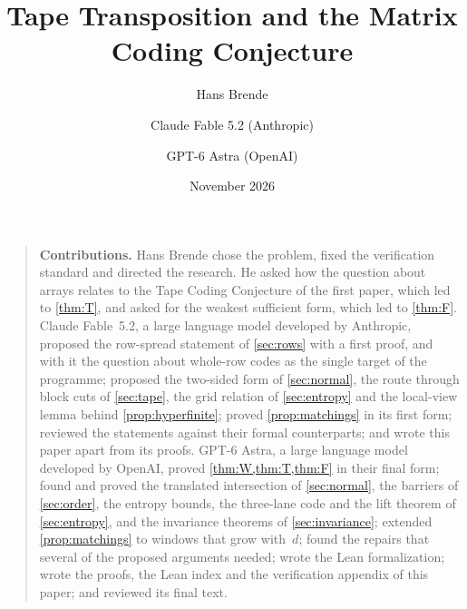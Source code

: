 \documentclass[11pt]{article}
\title{Tape Transposition and the Matrix Coding Conjecture}
\author{Hans Brende \and Claude Fable 5.2 (Anthropic) \and GPT-6 Astra (OpenAI)}
\date{November 2026}
\begin{document}
\maketitle

\begin{abstract}

\end{abstract}

\clearpage

\begin{quote}\small
\textbf{Contributions.} Hans Brende chose the problem, fixed the verification standard and directed the research. He
asked how the question about arrays relates to the Tape Coding Conjecture of the first paper, which led to
\cref{thm:T}, and asked for the weakest sufficient form, which led to \cref{thm:F}. Claude Fable~5.2, a large language
model developed by Anthropic, proposed the row-spread statement of \cref{sec:rows} with a first proof, and with it the
question about whole-row codes as the single target of the programme; proposed the two-sided form of
\cref{sec:normal}, the route through block cuts of \cref{sec:tape}, the grid relation of \cref{sec:entropy} and the
local-view lemma behind \cref{prop:hyperfinite}; proved \cref{prop:matchings} in its first form; reviewed the
statements against their formal counterparts; and wrote this paper apart from its proofs. GPT-6 Astra, a large
language model developed by OpenAI, proved \cref{thm:W,thm:T,thm:F}
in their final form; found and proved the translated intersection of \cref{sec:normal}, the barriers of
\cref{sec:order}, the entropy bounds, the three-lane code and the lift theorem of \cref{sec:entropy}, and the
invariance theorems of \cref{sec:invariance}; extended \cref{prop:matchings} to windows that grow with~$d$; found
the repairs that several of the proposed arguments needed; wrote the Lean formalization; wrote the proofs, the
Lean index and the verification appendix of this paper; and reviewed its final text.
\end{quote}

\tableofcontents
\clearpage













\appendix





\end{document}

